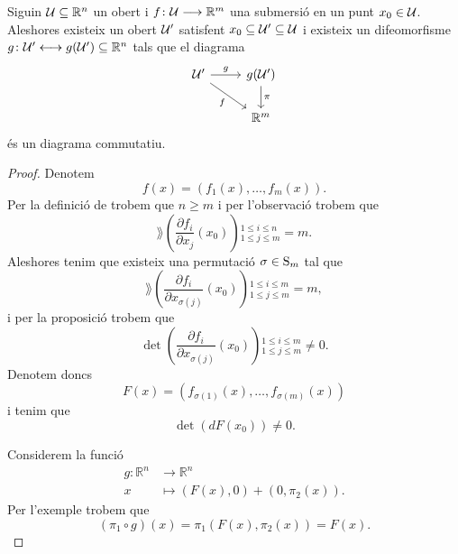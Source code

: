 \documentclass[../../Main.tex]{subfiles}
\begin{document}
	\begin{theorem}
		\label{thm:Teorema d'estructura local de les submersions}
		Siguin \(\mathcal{U}\subseteq\mathbb{R}^{n}\) un obert i \(f\colon\mathcal{U}\longrightarrow\mathbb{R}^{m}\) una submersió en un punt \(x_{0}\in\mathcal{U}\). Aleshores existeix un obert \(\mathcal{U}'\) satisfent \(x_{0}\subseteq\mathcal{U}'\subseteq\mathcal{U}\) i existeix un difeomorfisme \(g\colon\mathcal{U}'\longleftrightarrow g(\mathcal{U}')\subseteq\mathbb{R}^{n}\) tals que el diagrama
		\[\begin{tikzcd}
			\obert{U}' \arrow{r}{g} \arrow[swap]{dr}{f} & g(\obert{U}') \arrow{d}{\pi} \\
			& \mathbb{R}^{m}
		\end{tikzcd}\]
		és un diagrama commutatiu.
		\begin{proof}
			Denotem
			\[f(x)=(f_{1}(x),\dots,f_{m}(x)).\]
			Per la definició de  trobem que \(n\geq m\) i per l'observació  trobem que
			\[\rang\left(\frac{\partial f_{i}}{\partial x_{j}}(x_{0})\right){}_{1\leq j\leq m}^{1\leq i\leq n}=m.\]
			Aleshores tenim que existeix una permutació \(\sigma\in\operatorname{S}_{m}\) tal que
			\[\rang\left(\frac{\partial f_{i}}{\partial x_{\sigma(j)}}(x_{0})\right){}_{1\leq j\leq m}^{1\leq i\leq m}=m,\]
			i per la proposició  trobem que
			\[\det\left(\frac{\partial f_{i}}{\partial x_{\sigma(j)}}(x_{0})\right){}_{1\leq j\leq m}^{1\leq i\leq m}\neq0.\]
			Denotem doncs
			\[F(x)=(f_{\sigma(1)}(x),\dots,f_{\sigma(m)}(x))\]
			i tenim que
			\begin{equation}
				\label{thm:Teorema d'estructura local de les submersions:eq:1}
				\det(dF(x_{0}))\neq0.
			\end{equation}
			
			Considerem la funció
			\begin{align*}
				g\colon\mathbb{R}^{n}&\longrightarrow\mathbb{R}^{n} \\
				x&\longmapsto(F(x),0)+(0,\pi_{2}(x)).
			\end{align*}
			Per l'exemple  trobem que
			\[(\pi_{1}\circ g)(x)=\pi_{1}(F(x),\pi_{2}(x))=F(x).\]
			

\end{proof}
\end{theorem}
\end{document}
